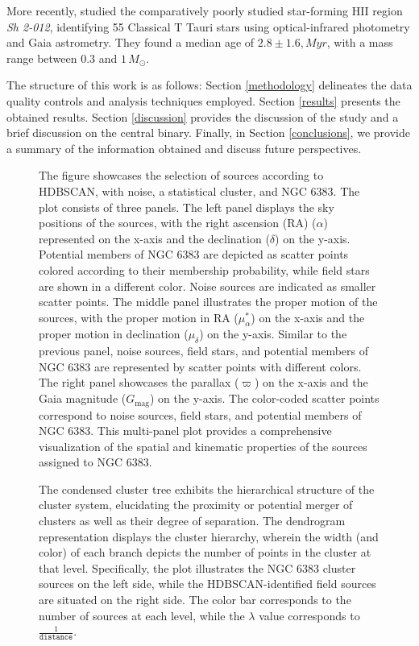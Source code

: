 \documentclass[fleqn,usenatbib,usedcolumn,useAMS]{mnras}
\begin{document}
More recently, \citet{2019MNRAS.484.5102K} studied the comparatively poorly studied star-forming HII region \textit{Sh 2-012}, identifying 55 Classical T Tauri stars using optical-infrared photometry and Gaia astrometry. They found a median age of $2.8 \pm 1.6,Myr$, with a mass range between $0.3$ and $1\,M_\odot$.

The structure of this work is as follows: Section \ref{methodology} delineates the data quality controls and analysis techniques employed. Section \ref{results} presents the obtained results. Section \ref{discussion} provides the discussion of the study and a brief discussion on the central binary. Finally, in Section \ref{conclusions}, we provide a summary of the information obtained and discuss future perspectives.

\begin{figure}
\centering
\caption{The figure showcases the selection of sources according to HDBSCAN, with noise, a statistical cluster, and NGC 6383. The plot consists of three panels. The left panel displays the sky positions of the sources, with the right ascension (RA) ($\alpha$) represented on the x-axis and the declination ($\delta$) on the y-axis. Potential members of NGC 6383 are depicted as scatter points colored according to their membership probability, while field stars are shown in a different color. Noise sources are indicated as smaller scatter points. The middle panel illustrates the proper motion of the sources, with the proper motion in RA ($\mu_\alpha^*$) on the x-axis and the proper motion in declination ($\mu_\delta$) on the y-axis. Similar to the previous panel, noise sources, field stars, and potential members of NGC 6383 are represented by scatter points with different colors. The right panel showcases the parallax ($\varpi$) on the x-axis and the Gaia magnitude ($G_{\textrm{mag}}$) on the y-axis. The color-coded scatter points correspond to noise sources, field stars, and potential members of NGC 6383. This multi-panel plot provides a comprehensive visualization of the spatial and kinematic properties of the sources assigned to NGC 6383.}
	\label{fig:general}
\end{figure}

\begin{figure}
\centering
 \caption{The condensed cluster tree exhibits the hierarchical structure of the cluster system, elucidating the proximity or potential merger of clusters as well as their degree of separation. The dendrogram representation displays the cluster hierarchy, wherein the width (and color) of each branch depicts the number of points in the cluster at that level. Specifically, the plot illustrates the NGC 6383 cluster sources on the left side, while the HDBSCAN-identified field sources are situated on the right side. The color bar corresponds to the number of sources at each level, while the $\lambda$ value corresponds to $\frac{1}{\texttt{distance}}$.}
\label{fig:condensed_cluster_tree}
\end{figure}
\end{document}
